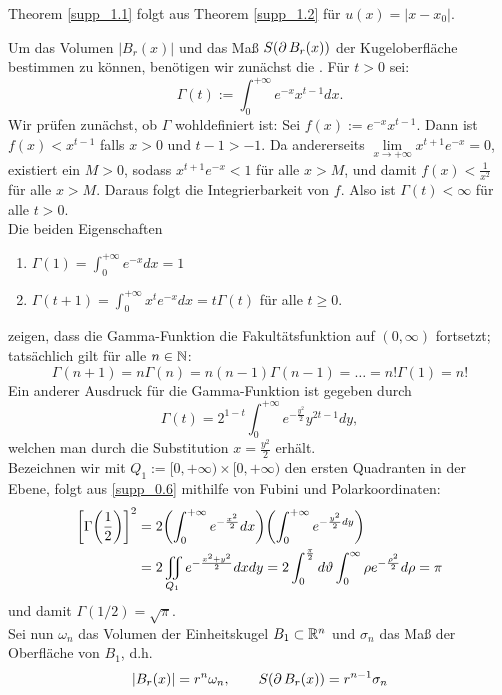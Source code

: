 \begin{bem} \label{supp_1.3}
	Theorem \ref{supp_1.1} folgt aus Theorem \ref{supp_1.2} für $u(x) = |x-x_0|$.
\end{bem}

	Um das Volumen $|B_r(x)|$ und das Maß $S(\operatorname{\partial} B_r(x))$ der Kugeloberfläche bestimmen zu können, benötigen wir zunächst die . Für $t > 0$ sei:
	\begin{equation}
		\Gamma(t) := \int_{0}^{+\infty} e^{-x} x^{t-1} dx. \label{supp_0.5}
	\end{equation}
	Wir prüfen zunächst, ob $\Gamma$ wohldefiniert ist: Sei $f(x) := e^{-x} x^{t-1}$. Dann ist $f(x) < x^{t-1}$ falls $x > 0$ und $t-1 > -1$. Da andererseits $\lim\limits_{x \rightarrow +\infty} x^{t+1}e^{-x} = 0$, existiert ein $M > 0$, sodass $x^{t+1}e^{-x} < 1$ für alle $x > M$, und damit $f(x) < \frac{1}{x^2}$ für alle $x > M$. Daraus folgt die Integrierbarkeit von $f$. Also ist $\Gamma(t) < \infty$ für alle $t > 0$. \\
	Die beiden Eigenschaften
	\begin{enumerate}[(1)]
		\item $\Gamma(1) = \int_{0}^{+\infty} e^{-x} dx = 1$
		\item $\Gamma(t+1) = \int_{0}^{+\infty} x^t e^{-x} dx = t \Gamma(t)$ für alle $t \geq 0$.
	\end{enumerate}
	zeigen, dass die Gamma-Funktion die Fakultätsfunktion auf $(0,\infty)$ fortsetzt; tatsächlich gilt für alle $n \in \mathbb{N}$:
	\[ \Gamma(n+1) = n \Gamma(n) = n(n-1)\Gamma(n-1) = \dots = n!\Gamma(1) = n!\]
	Ein anderer Ausdruck für die Gamma-Funktion ist gegeben durch
	\begin{equation}
		\Gamma(t) = 2^{1-t} \int_0^{+\infty} e^{-\frac{y^2}{2}}y^{2t-1} dy, \label{supp_0.6}
	\end{equation}
	welchen man durch die Substitution $x = \frac{y^2}{2}$ erhält. \\
	Bezeichnen wir mit $Q_1 := [0,+\infty) \times [0,+\infty)$ den ersten Quadranten in der Ebene, folgt aus \eqref{supp_0.6} mithilfe von Fubini und Polarkoordinaten:
	\begin{equation}
	\begin{aligned}
		\left\lbrack \Gamma \enbrace*{\frac{1}{2}} \right\rbrack^2 &= 2 \enbrace*{ \int_0^{+\infty} e^{-\frac{x^2}{2}} dx} \enbrace*{ \int_{0}^{+\infty} e^{-\frac{y^2}{2} dy}} \\ \notag
		&= 2 \iint_{Q_1} e^{-\frac{x^2+y^2}{2}} dxdy = 2 \int_{0}^{\frac{\pi}{2}} d\vartheta \int_0^{\infty} \rho e^{-\frac{\rho^2}{2}} d\rho = \pi
	\end{aligned}
	\end{equation}
	und damit $\Gamma(1/2) = \sqrt{\pi}$. \\
	Sei nun $\omega_n$ das Volumen der Einheitskugel $B_1 \subset \mathbb{R}^n$ und $\sigma_n$ das Maß der Oberfläche von $B_1$, d.h.
	\begin{equation}
		|B_r(x)| = r^n \omega_n, \qquad S(\operatorname{\partial} B_r(x)) = r^{n-1} \sigma_n \label{supp_0.7}
	\end{equation}
	
